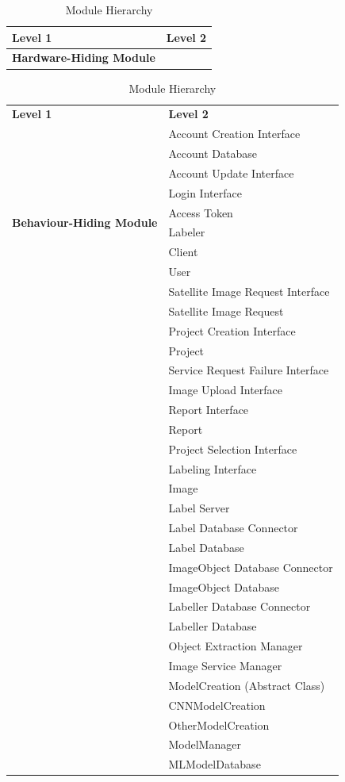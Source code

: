 \documentclass[12pt, titlepage]{article}
\begin{document}
\newpage 
\begin{table}[h!]
  \centering
  \begin{tabular}{p{} p{}}
  \toprule
  \textbf{Level 1} & \textbf{Level 2}\\
  \midrule
  
  \textbf{Hardware-Hiding Module} & ~ \\
  \midrule
\end{tabular}
\caption{Module Hierarchy}
\label{TblMH}
\end{table}
\begin{table}[h!]
  \centering
  \begin{tabular}{p{} p{}}
  \toprule
  \textbf{Level 1} & \textbf{Level 2}\\
  \multirow{10}{0.3\textwidth}{\textbf{Behaviour-Hiding Module}} 
   & Account Creation Interface\\
   & Account Database\\
   & Account Update Interface\\
   & Login Interface\\
   & Access Token\\
   & Labeler\\
   & Client\\
   & User\\
   & Satellite Image Request Interface\\
   & Satellite Image Request\\
   & Project Creation Interface\\
   & Project\\
   & Service Request Failure Interface\\
   & Image Upload Interface\\
   & Report Interface\\
   & Report\\
   & Project Selection Interface\\
   & Labeling Interface\\
   & Image\\
   & Label Server\\
   & Label Database Connector\\
   & Label Database\\
   & ImageObject Database Connector\\
   & ImageObject Database\\
   & Labeller Database Connector\\
   & Labeller Database\\
   & Object Extraction Manager\\
   & Image Service Manager\\
   & ModelCreation (Abstract Class)\\
   & CNNModelCreation\\
   & OtherModelCreation\\
   & ModelManager\\
   & MLModelDatabase\\
  \midrule
\end{tabular}
\caption{Module Hierarchy}
\label{TblMH}
\end{table}
\end{document}
